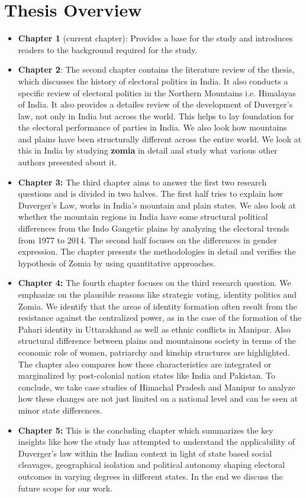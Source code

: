\section{Thesis Overview}

\begin{itemize}
    \item \textbf{Chapter 1} (current chapter): Provides a base for the study and introduces readers to the background required for the study.
    \item \textbf{Chapter 2}: The second chapter contains the literature review of the thesis, which discusses the history of electoral politics in India. It also conducts a specific review of electoral politics in the Northern Mountains i.e. Himalayas of India. It also provides a detailes review of the development of Duverger's law, not only in India but across the world. This helps to lay foundation for the electoral performance of parties in India. We also look how mountains and plains have been structurally different across the entire world. We look at this in India by studying \textbf{zomia} in detail and study what various other authors presented about it.
    \item \textbf{Chapter 3:} The third chapter aims to answer the first two research questions and is divided in two halves. The first half tries to explain how Duverger's Law, works in India's mountain and plain states. We also look at whether the mountain regions in India have some structural political differences from the Indo Gangetic plains by analyzing the electoral trends from 1977 to 2014. The second half focuses on the differences in gender expression. The chapter presents the methodologies in detail and verifies the hypothesis of Zomia by using quantitative approaches.
    \item \textbf{Chapter 4:} The fourth chapter focuses on the third research question. We emphasize on the plausible reasons like strategic voting, identity politics and Zomia. We identify that the areas of identity formation often result from the resistance against the centralized power, as in the case of the formation of the Pahari identity in Uttarakhand as well as ethnic conflicts in Manipur. Also structural difference between plains and mountainous society in terms of the economic role of women, patriarchy and kinship structures are highlighted. The chapter also compares how these characteristics are integrated or marginalized by post-colonial nation states like India and Pakistan. To conclude, we take case studies of Himachal Pradesh and Manipur to analyze how these changes are not just limited on a national level and can be seen at minor state differences.
    \item \textbf{Chapter 5:} This is the concluding chapter which summarizes the key insights like how the study  has attempted to understand the applicability of Duverger's law within the Indian context in light of state based social cleavages, geographical isolation and political autonomy shaping electoral outcomes in varying degrees in different states. In the end we discuss the future scope for our work.
\end{itemize}